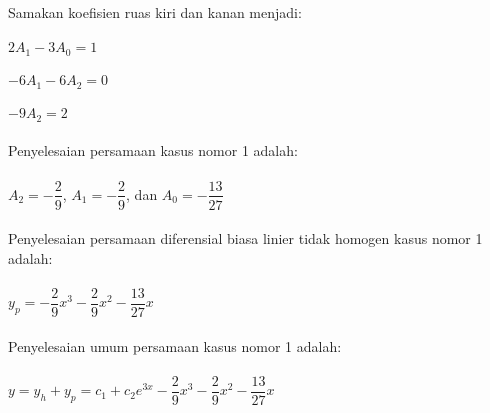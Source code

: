 \begin{enumerate}[1.]
	Samakan koefisien ruas kiri dan kanan menjadi: \\ \\
	\begin{math} 2 A_1 - 3 A_0 = 1 \end{math}  \\ \\
	\begin{math} -6 A_1 - 6 A_2 = 0 \end{math}  \\ \\
	\begin{math} -9 A_2 = 2 \end{math}  \\ \\
	Penyelesaian persamaan kasus nomor 1 adalah: \\ \\
	\begin{math} A_2 = -\dfrac{2}{9} \end{math}, \begin{math} A_1 = -\dfrac{2}{9} \end{math}, dan \begin{math} A_0 = -\dfrac{13}{27} \end{math} \\ \\
	Penyelesaian persamaan diferensial biasa linier tidak homogen kasus nomor 1 adalah: \\ \\
	\begin{math} y_p = -\dfrac{2}{9} x^{3} -\dfrac{2}{9} x^{2} - \dfrac{13}{27} x \end{math} \\ \\
	Penyelesaian umum persamaan kasus nomor 1 adalah: \\ \\
	\begin{math} y = y_h + y_p = c_1 + c_2 e^{3x} -\dfrac{2}{9} x^{3} -\dfrac{2}{9} x^{2} - \dfrac{13}{27} x  \end{math} 


\end{enumerate}

